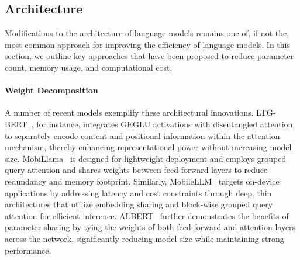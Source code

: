 \subsection{Architecture}

Modifications to the architecture of language models remains one of, if not the, most common approach for improving the efficiency of language models. In this section, we outline key approaches that have been proposed to reduce parameter count, memory usage, and computational cost.

\paragraph{Weight Decomposition}
A number of recent models exemplify these architectural innovations. LTG-BERT~\citep{samuel2023ltgbert}, for instance, integrates GEGLU activations with disentangled attention to separately encode content and positional information within the attention mechanism, thereby enhancing representational power without increasing model size. MobiLlama~\citep{thawakar2024mobillama} is designed for lightweight deployment and employs grouped query attention and shares weights between feed-forward layers to reduce redundancy and memory footprint. Similarly, MobileLLM~\citep{liu2024mobilellm} targets on-device applications by addressing latency and cost constraints through deep, thin architectures that utilize embedding sharing and block-wise grouped query attention for efficient inference. ALBERT~\citep{lan2019albert} further demonstrates the benefits of parameter sharing by tying the weights of both feed-forward and attention layers across the network, significantly reducing model size while maintaining strong performance.

